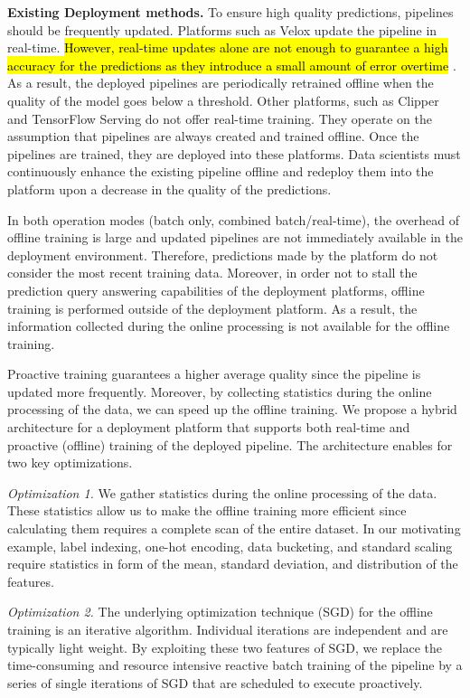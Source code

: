 \documentclass[10pt,conference,letterpaper]{IEEEtran}
\begin{document}
\textbf{Existing Deployment methods.} 
To ensure high quality predictions, pipelines should be frequently updated.
Platforms such as Velox update the pipeline in real-time.
\hl{However, real-time updates alone are not enough to guarantee a high accuracy for the predictions as they introduce a small amount of error overtime }\cite{crankshaw2014missing}.
As a result, the deployed pipelines are periodically retrained offline when the quality of the model goes below a threshold.
Other platforms, such as Clipper and TensorFlow Serving do not offer real-time training.
They operate on the assumption that pipelines are always created and trained offline.
Once the pipelines are trained, they are deployed into these platforms.
Data scientists must continuously enhance the existing pipeline offline and redeploy them into the platform upon a decrease in the quality of the predictions.

In both operation modes (batch only, combined batch/real-time), the overhead of offline training is large and updated pipelines are not immediately available in the deployment environment.
Therefore, predictions made by the platform do not consider the most recent training data.
Moreover, in order not to stall the prediction query answering capabilities of the deployment platforms, offline training is performed outside of the deployment platform.
As a result, the information collected during the online processing is not available for the offline training. 

Proactive training guarantees a higher average quality since the pipeline is updated more frequently.
Moreover, by collecting statistics during the online processing of the data, we can speed up the offline training.
We propose a hybrid architecture for a deployment platform that supports both real-time and proactive (offline) training of the deployed pipeline.
The architecture enables for two key optimizations.

\textit{Optimization 1.} 
We gather statistics during the online processing of the data. 
These statistics allow us to make the offline training more efficient since calculating them requires a complete scan of the entire dataset.
In our motivating example, label indexing, one-hot encoding, data bucketing, and standard scaling require statistics in form of the mean, standard deviation, and distribution of the features.

\textit{Optimization 2.}
The underlying optimization technique (SGD) for the offline training is an iterative algorithm.
Individual iterations are independent and are typically light weight.
By exploiting these two features of SGD, we replace the time-consuming and resource intensive reactive batch training of the pipeline by a series of single iterations of SGD that are scheduled to execute proactively.
\end{document}
